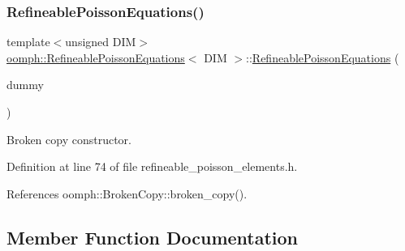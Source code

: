 \subsubsection{\texorpdfstring{Refineable\+Poisson\+Equations()}{RefineablePoissonEquations()}\hspace{0.1cm}{\footnotesize\ttfamily [2/2]}}
{\footnotesize\ttfamily template$<$unsigned D\+IM$>$ \\
\hyperlink{classoomph_1_1RefineablePoissonEquations}{oomph\+::\+Refineable\+Poisson\+Equations}$<$ D\+IM $>$\+::\hyperlink{classoomph_1_1RefineablePoissonEquations}{Refineable\+Poisson\+Equations} (\begin{DoxyParamCaption}\item[{const \hyperlink{classoomph_1_1RefineablePoissonEquations}{Refineable\+Poisson\+Equations}$<$ D\+IM $>$ \&}]{dummy }\end{DoxyParamCaption})\hspace{0.3cm}{\ttfamily [inline]}}



Broken copy constructor. 



Definition at line 74 of file refineable\+\_\+poisson\+\_\+elements.\+h.



References oomph\+::\+Broken\+Copy\+::broken\+\_\+copy().



\subsection{Member Function Documentation}
\mbox{\label{classoomph_1_1RefineablePoissonEquations_aa1330f79f5a9d44aef1a6984671fe160}} 
